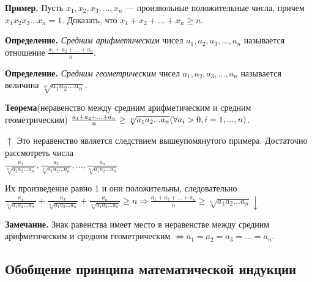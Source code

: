 \documentclass{article}
\begin{document}
    \textbf{Пример.} Пусть \(x_1, x_2, x_3, ..., x_n\) --- произвольные положительные числа, причем \(x_1 x_2 x_3 ... x_n = 1\). Доказать, что \(x_1 + x_2 + ... + x_n \geq n\).

    \textbf{Определение.} \textit{Средним арифметическим} чисел \(a_1, a_2, a_3,..., a_n\) называется отношение \(\frac{a_1 + a_2 + ... + a_n}{n}\).

    \textbf{Определение.} \textit{Средним геометрическим} чисел \(a_1, a_2, a_3,..., a_n\) называется величина \(\sqrt[n]{a_1 a_2 ... a_n}\).

    \textbf{Теорема}(неравенство между средним арифметическим и средним геометрическим) \(\frac{a_1 + a_2 + ... + a_n}{n} \geq \sqrt[n]{a_1 a_2 ... a_n}\\ (\forall a_i > 0, i = 1, ..., n)\).

    \(\uparrow\) Это неравенство является следствием вышеупомянутого примера. Достаточно рассмотреть числа\\
    \(\frac{a_1}{\sqrt[n]{a_1 a_2 ... a_n}}, \frac{a_2}{\sqrt[n]{a_1 a_2 ... a_n}}, ..., \frac{a_n}{\sqrt[n]{a_1 a_2 ... a_n}}\)

    Их произведение равно 1 и они положительны, следовательно \(\frac{a_1}{\sqrt[n]{a_1 a_2 ... a_n}} + \frac{a_2}{\sqrt[n]{a_1 a_2 ... a_n}} + \frac{a_n}{\sqrt[n]{a_1 a_2 ... a_n}} \geq n \Rightarrow \frac{a_1 + a_2 + ... + a_n}{n} \geq \sqrt[n]{a_1 a_2 ... a_n} \downarrow\)

    \textbf{Замечание.} Знак равенства имеет место в неравенстве между средним арифметическим и средним геометрическим \(\Leftrightarrow a_1 = a_2 = a_3 = ... = a_n\).

    \subsection{Обобщение принципа математической индукции}
\end{document}
